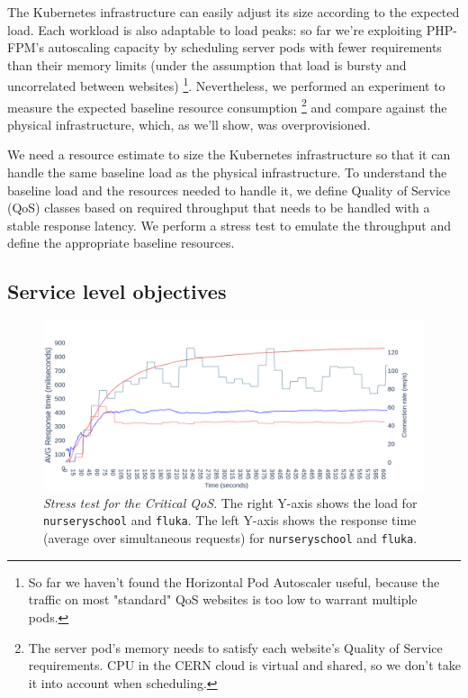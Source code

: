 The Kubernetes infrastructure can easily adjust its size according to the expected load.
Each workload is also adaptable to load peaks:
so far we're exploiting PHP-FPM's autoscaling capacity by scheduling server pods with fewer requirements than their memory limits
(under the assumption that load is bursty and uncorrelated between websites)
\footnote{So far we haven't found the Horizontal Pod Autoscaler useful, because the traffic on most "standard" QoS websites is too low to warrant multiple pods.}.
Nevertheless, we performed an experiment to measure the expected baseline resource consumption
\footnote{The server pod's memory needs to satisfy each website's Quality of Service requirements.
CPU in the CERN cloud is virtual and shared, so we don't take it into account when scheduling.}
and compare against the physical infrastructure, which, as we'll show, was overprovisioned.

We need a resource estimate to size the Kubernetes infrastructure so that it can handle the same baseline load as the physical infrastructure.
To understand the baseline load and the resources needed to handle it, we define Quality of Service (QoS) classes based on required throughput
that needs to be handled with a stable response latency.
We perform a stress test to emulate the throughput and define the appropriate baseline resources.

\subsection{Service level objectives}

\begin{figure}[t]
\centering
\captionsetup{justification=centering,margin=0.3cm}
\vspace{-2em}
\includegraphics[width=1.1\linewidth]{figures/experiment-figures/critical_run.png}
\caption{\emph{Stress test for the Critical QoS}.
The right Y-axis shows the load for {\color[HTML]{F66565} \texttt{nurseryschool}} and {\color[HTML]{5D8AA8} \texttt{fluka}}.
The left Y-axis shows the response time (average over simultaneous requests) for {\color[HTML]{D23232} \texttt{nurseryschool}} and {\color[HTML]{0000FF} \texttt{fluka}}.}
\label{stress_usage}
\vspace{-2em}
\end{figure}


